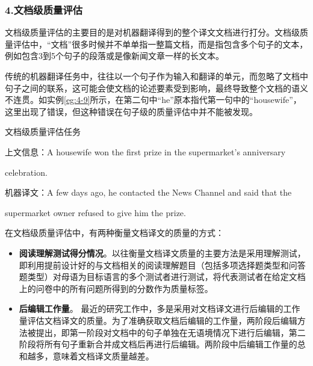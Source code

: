 
\subsubsection{4.文档级质量评估}

\parinterval 文档级质量评估的主要目的是对机器翻译得到的整个译文文档进行打分。文档级质量评估中，“文档”很多时候并不单单指一整篇文档，而是指包含多个句子的文本，例如包含3到5个句子的段落或是像新闻文章一样的长文本。

\parinterval 传统的机器翻译任务中，往往以一个句子作为输入和翻译的单元，而忽略了文档中句子之间的联系，这可能会使文档的论述要素受到影响，最终导致整个文档的语义不连贯。如实例\ref{eg:4-9}所示，在第二句中“he”原本指代第一句中的“housewife”，这里出现了错误，但这种错误在句子级的质量评估中并不能被发现。

\begin{example}
文档级质量评估任务

上文信息：A {\red housewife} won the first prize in the supermarket's anniversary

\hspace{5em}celebration.

机器译文：A few days ago, {\red he} contacted the News Channel and said that the

\hspace{5em}supermarket owner refused to give {\red him} the prize.
\label{eg:4-9}
\end{example}

\parinterval 在文档级质量评估中，有两种衡量文档译文的质量的方式：

\begin{itemize}
\vspace{0.5em}
\item {\small\sffamily\bfseries{阅读理解测试得分情况}}。以往衡量文档译文质量的主要方法是采用理解测试，即利用提前设计好的与文档相关的阅读理解题目（包括多项选择题类型和问答题类型）对母语为目标语言的多个测试者进行测试，将代表测试者在给定文档上的问卷中的所有问题所得到的分数作为质量标签。
\vspace{0.5em}
\item {\small\sffamily\bfseries{后编辑工作量}}。 最近的研究工作中，多是采用对文档译文进行后编辑的工作量评估文档译文的质量。为了准确获取文档后编辑的工作量，两阶段后编辑方法被提出，即第一阶段对文档中的句子单独在无语境情况下进行后编辑，第二阶段将所有句子重新合并成文档后再进行后编辑。两阶段中后编辑工作量的总和越多，意味着文档译文质量越差。
\vspace{0.5em}
\end{itemize}

